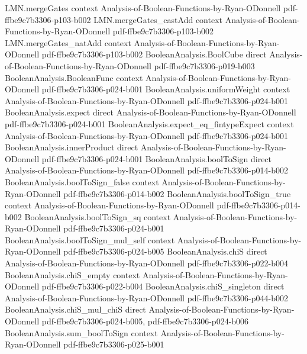 \begin{lemma}
\proofstep
  {LMN.mergeGates}
  {context}
  {Analysis-of-Boolean-Functions-by-Ryan-ODonnell}
  {pdf-ffbe9c7b3306-p103-b002}
\proofstep
  {LMN.mergeGates_castAdd}
  {context}
  {Analysis-of-Boolean-Functions-by-Ryan-ODonnell}
  {pdf-ffbe9c7b3306-p103-b002}
\proofstep
  {LMN.mergeGates_natAdd}
  {context}
  {Analysis-of-Boolean-Functions-by-Ryan-ODonnell}
  {pdf-ffbe9c7b3306-p103-b002}
\proofstep
  {BooleanAnalysis.BoolCube}
  {direct}
  {Analysis-of-Boolean-Functions-by-Ryan-ODonnell}
  {pdf-ffbe9c7b3306-p019-b003}
\proofstep
  {BooleanAnalysis.BooleanFunc}
  {context}
  {Analysis-of-Boolean-Functions-by-Ryan-ODonnell}
  {pdf-ffbe9c7b3306-p024-b001}
\proofstep
  {BooleanAnalysis.uniformWeight}
  {context}
  {Analysis-of-Boolean-Functions-by-Ryan-ODonnell}
  {pdf-ffbe9c7b3306-p024-b001}
\proofstep
  {BooleanAnalysis.expect}
  {direct}
  {Analysis-of-Boolean-Functions-by-Ryan-ODonnell}
  {pdf-ffbe9c7b3306-p024-b001}
\proofstep
  {BooleanAnalysis.expect_eq_fintypeExpect}
  {context}
  {Analysis-of-Boolean-Functions-by-Ryan-ODonnell}
  {pdf-ffbe9c7b3306-p024-b001}
\proofstep
  {BooleanAnalysis.innerProduct}
  {direct}
  {Analysis-of-Boolean-Functions-by-Ryan-ODonnell}
  {pdf-ffbe9c7b3306-p024-b001}
\proofstep
  {BooleanAnalysis.boolToSign}
  {direct}
  {Analysis-of-Boolean-Functions-by-Ryan-ODonnell}
  {pdf-ffbe9c7b3306-p014-b002}
\proofstep
  {BooleanAnalysis.boolToSign_false}
  {context}
  {Analysis-of-Boolean-Functions-by-Ryan-ODonnell}
  {pdf-ffbe9c7b3306-p014-b002}
\proofstep
  {BooleanAnalysis.boolToSign_true}
  {context}
  {Analysis-of-Boolean-Functions-by-Ryan-ODonnell}
  {pdf-ffbe9c7b3306-p014-b002}
\proofstep
  {BooleanAnalysis.boolToSign_sq}
  {context}
  {Analysis-of-Boolean-Functions-by-Ryan-ODonnell}
  {pdf-ffbe9c7b3306-p024-b001}
\proofstep
  {BooleanAnalysis.boolToSign_mul_self}
  {context}
  {Analysis-of-Boolean-Functions-by-Ryan-ODonnell}
  {pdf-ffbe9c7b3306-p024-b005}
\proofstep
  {BooleanAnalysis.chiS}
  {direct}
  {Analysis-of-Boolean-Functions-by-Ryan-ODonnell}
  {pdf-ffbe9c7b3306-p022-b004}
\proofstep
  {BooleanAnalysis.chiS_empty}
  {context}
  {Analysis-of-Boolean-Functions-by-Ryan-ODonnell}
  {pdf-ffbe9c7b3306-p022-b004}
\proofstep
  {BooleanAnalysis.chiS_singleton}
  {direct}
  {Analysis-of-Boolean-Functions-by-Ryan-ODonnell}
  {pdf-ffbe9c7b3306-p044-b002}
\proofstep
  {BooleanAnalysis.chiS_mul_chiS}
  {direct}
  {Analysis-of-Boolean-Functions-by-Ryan-ODonnell}
  {pdf-ffbe9c7b3306-p024-b005,
    pdf-ffbe9c7b3306-p024-b006}
\proofstep
  {BooleanAnalysis.sum_boolToSign}
  {context}
  {Analysis-of-Boolean-Functions-by-Ryan-ODonnell}
  {pdf-ffbe9c7b3306-p025-b001}

\end{lemma}
